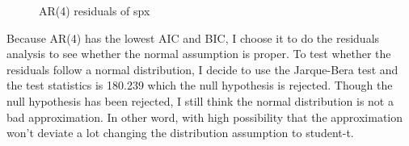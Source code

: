 \documentclass{article}
\begin{document}
\newpage


\begin{figure}[h]
	\centering
	
	\caption{AR(4) residuals of spx}
\end{figure}

Because AR(4) has the lowest AIC and BIC, I choose it to do the residuals
analysis to see whether the normal assumption is proper. To test whether the residuals
follow a normal distribution, I decide to use the Jarque-Bera test and the test
statistics is 180.239 which the null hypothesis is rejected. Though the null hypothesis
has been rejected, I still think the normal distribution is not a bad approximation.
In other word, with high possibility that the approximation won't deviate a lot changing
the distribution assumption to student-t.

\newpage
\end{document}
